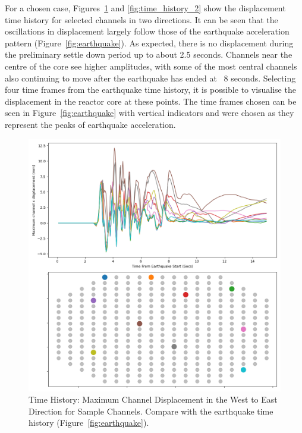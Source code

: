 For a chosen case, Figures~\ref{fig:time_history_1} and \ref{fig:time_history_2} show the displacement time history for selected channels in two directions. It can be seen that the oscillations in displacement largely follow those of the earthquake acceleration pattern (Figure~\ref{fig:earthquake}). As expected, there is no displacement during the preliminary settle down period up to about 2.5 seconds. Channels near the centre of the core see higher amplitudes, with some of the most central channels also continuing to move after the earthquake has ended at ~8 seconds.  
Selecting four time frames from the earthquake time history, it is possible to visualise the displacement in the reactor core at these points. The time frames chosen can be seen in Figure~\ref{fig:earthquake} with vertical indicators and were chosen as they represent the peaks of earthquake acceleration. 
\\

\begin{figure}[p]
	\centering
	\includegraphics[scale=0.45]{Figures/time_history.png}
	\caption{Time History: Maximum Channel Displacement in the West to East Direction for Sample Channels. Compare with the earthquake time history (Figure~\ref{fig:earthquake}).}
	\label{fig:time_history_1}
\end{figure}

